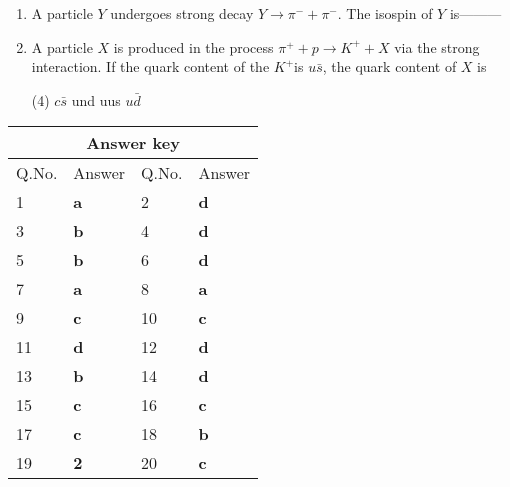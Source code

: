 \begin{enumerate}
	\item  A particle $Y$ undergoes strong decay $Y \rightarrow \pi^{-}+\pi^{-}$. The isospin of $Y$ is---------
	{}

	\item  A particle $X$ is produced in the process $\pi^{+}+p \rightarrow K^{+}+X$ via the strong interaction. If the quark content of the $K^{+}$is $u \bar{s}$, the quark content of $X$ is
{}
	 \begin{tasks}(4)
		\task[\textbf{a.}]$c \bar{s}$
		\task[\textbf{b.}]und
		\task[\textbf{c.}]uus
		\task[\textbf{d.}]$u \bar{d}$ 
	\end{tasks}

\end{enumerate}
\setlength\arrayrulewidth{1pt}
\begin{table}[H]
	\centering
	\begin{tabular}{|p{1.5cm}|p{1.5cm}||p{1.5cm}|p{1.5cm}|}
		\hline
		\multicolumn{4}{|c|}{\textbf{Answer key}}\\\hline\hline
		\rowcolor{ocrel}Q.No.&Answer&Q.No.&Answer\\\hline
		1&\textbf{a} &2&\textbf{d}\\\hline 
		3&\textbf{b} &4&\textbf{d} \\\hline
		5&\textbf{b} &6&\textbf{d} \\\hline
		7&\textbf{a}&8&\textbf{a}\\\hline
		9&\textbf{c}&10&\textbf{c}\\\hline
		11&\textbf{d} &12&\textbf{d}\\\hline
		13&\textbf{b}&14&\textbf{d}\\\hline
		15&\textbf{c}&16&\textbf{c} \\\hline
		17&\textbf{c}&18&\textbf{b}\\\hline
		19&\textbf{2}&20&\textbf{c}\\\hline
	\end{tabular}
\end{table}